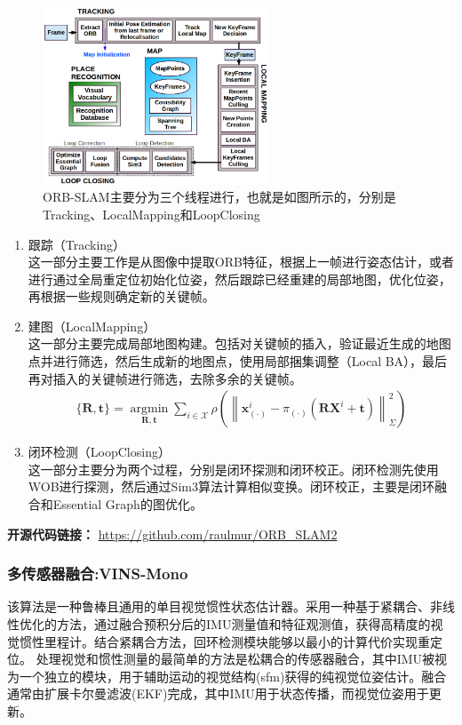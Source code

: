 \documentclass[cs4size,a4paper]{ctexart}
\numberwithin{equation}{section}
\numberwithin{table}{section}
\numberwithin{figure}{section}
\begin{document}
\begin{figure}[H]
    \centering
    \includegraphics[width=0.6\textwidth]{figure/orb.png}
    \caption{ORB-SLAM主要分为三个线程进行，也就是如图所示的，分别是Tracking、LocalMapping和LoopClosing}
\end{figure}

\begin{enumerate}
        \item 跟踪（Tracking）\\ 这一部分主要工作是从图像中提取ORB特征，根据上一帧进行姿态估计，或者进行通过全局重定位初始化位姿，然后跟踪已经重建的局部地图，优化位姿，再根据一些规则确定新的关键帧。
        \item 建图（LocalMapping）\\ 这一部分主要完成局部地图构建。包括对关键帧的插入，验证最近生成的地图点并进行筛选，然后生成新的地图点，使用局部捆集调整（Local BA），最后再对插入的关键帧进行筛选，去除多余的关键帧。
        \begin{align}
                \{\mathbf{R}, \mathbf{t}\}=\underset{\mathbf{R}, \mathbf{t}}{\operatorname{argmin}} \sum_{i \in \mathcal{X}} \rho\left(\left\|\mathbf{x}_{(\cdot)}^{i}-\pi_{(\cdot)}\left(\mathbf{R} \mathbf{X}^{i}+\mathbf{t}\right)\right\|_{\Sigma}^{2}\right)
        \end{align}
        \item 闭环检测（LoopClosing）\\ 这一部分主要分为两个过程，分别是闭环探测和闭环校正。闭环检测先使用WOB进行探测，然后通过Sim3算法计算相似变换。闭环校正，主要是闭环融合和Essential Graph的图优化。
\end{enumerate}

\textbf{开源代码链接：}
\url{https://github.com/raulmur/ORB_SLAM2}

\subsubsection{多传感器融合:VINS-Mono}
该算法\cite{8421746}是一种鲁棒且通用的单目视觉惯性状态估计器。采用一种基于紧耦合、非线性优化的方法，通过融合预积分后的IMU测量值和特征观测值，获得高精度的视觉惯性里程计。结合紧耦合方法，回环检测模块能够以最小的计算代价实现重定位。
处理视觉和惯性测量的最简单的方法是松耦合的传感器融合\cite{8576618,8630025}，其中IMU被视为一个独立的模块，用于辅助运动的视觉结构(sfm)获得的纯视觉位姿估计。融合通常由扩展卡尔曼滤波(EKF)完成，其中IMU用于状态传播，而视觉位姿用于更新。
  
\end{document}
